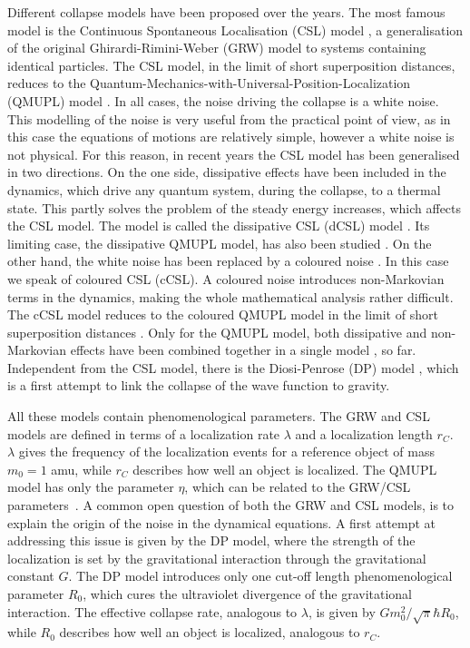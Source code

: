 \documentclass[12pt,groupedaddress,pra,aps]{revtex4-1}
\begin{document}
Different collapse models have been proposed over the years. The most famous model is the Continuous Spontaneous Localisation (CSL) model \cite{PhysRevA.39.2277,PhysRevA.42.78}, a generalisation of the original Ghirardi-Rimini-Weber (GRW) model \cite{PhysRevD.34.470} to systems containing identical particles. The CSL model, in the limit of short superposition distances, reduces to the Quantum-Mechanics-with-Universal-Position-Localization (QMUPL) model \cite{PhysRevA.40.1165,PhysRevA.42.5086}. In all cases, the noise driving the collapse is a white noise. This modelling of the noise is very useful from the practical point of view, as in this case the equations of motions are relatively simple, however a white noise is not physical. For this reason, in recent years the CSL model has been generalised in two directions. On the one side, dissipative effects have been included in the dynamics, which drive any quantum system, during the collapse, to a thermal state. This partly solves the problem of the steady energy increases, which affects the CSL model. The model is called the dissipative CSL (dCSL) model \cite{Smirne:2014paa}. Its limiting case, the dissipative QMUPL model, has also been studied \cite{0305-4470-38-37-007}. On the other hand, the white noise has been replaced by a coloured noise \cite{PhysRevA.48.913,1751-8121-40-50-012, 1751-8121-41-39-395308}. In this case we speak of coloured CSL (cCSL). A coloured noise introduces non-Markovian terms in the dynamics, making the whole mathematical analysis rather difficult. The cCSL model reduces to the coloured QMUPL model in the limit of short superposition distances \cite{PhysRevA.80.012116}. Only for  the QMUPL model, both dissipative and non-Markovian effects have been combined together in a single model \cite{PhysRevA.86.022108}, so far. Independent from the CSL model, there is the Diosi-Penrose (DP) model \cite{PhysRevA.40.1165}, which is a first attempt to link the collapse of the wave function to gravity. 

All these models contain phenomenological parameters. The GRW and CSL models are defined in terms of a localization rate $\lambda$ and a localization length $r_C$. $\lambda$ gives the frequency of the localization events for a reference object of mass $m_0=1$ amu, while $r_C$ describes how well an object is localized. The QMUPL model has only the parameter $\eta$, which can be related to the GRW/CSL parameters~\cite{durr2011stochastic}. A common open question of both the GRW and CSL models, is to explain the origin of the noise in the dynamical equations. A first attempt at addressing this issue is given by the DP model, where the strength of the localization is set by the  gravitational interaction through the gravitational constant $G$. The DP model introduces only one cut-off length phenomenological parameter $R_0$, which cures the ultraviolet divergence of the gravitational interaction. The effective collapse rate, analogous to $\lambda$, is given by $G m_0^2/\sqrt{\pi} \hbar  R_0$, while $R_0$ describes how well an object is localized, analogous to $r_C$. 
\end{document}
